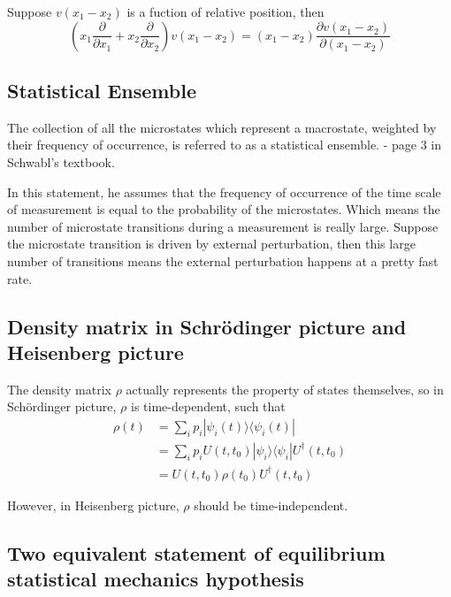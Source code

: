 \documentclass[10pt]{article}
\begin{document}
	Suppose $v(x_1 - x_2)$ is a fuction of relative position, then
	\begin{equation}
		\left(x_1 \frac{\partial}{\partial x_1} + x_2 \frac{\partial}{\partial x_2}\right) v(x_1 - x_2) = (x_1 - x_2) \frac{\partial v(x_1 - x_2)}{\partial (x_1 - x_2)}
	\end{equation}

	\subsection{Statistical Ensemble}

	\begin{remark}
		The collection of all the microstates which represent a macrostate, weighted by their frequency of occurrence, is referred to as a statistical ensemble. - page 3 in Schwabl's textbook.
	\end{remark}

	In this statement, he assumes that the frequency of occurrence of the time scale of measurement is equal to the probability of the microstates. Which means the number of microstate transitions during a measurement is really large. Suppose the microstate transition is driven by external perturbation, then this large number of transitions means the external perturbation happens at a pretty fast rate.

	\subsection{Density matrix in Schr\"{o}dinger picture and Heisenberg picture}

	The density matrix $\rho$ actually represents the property of states themselves, so in Sch\"{o}rdinger picture, $\rho$ is time-dependent, such that
	\begin{align*}
	\rho(t) &= \sum_i p_i |\psi_i(t) \rangle \langle \psi_i (t) | \\
	&= \sum_i p_i U(t,t_0)|\psi_i \rangle \langle \psi_i |U^{\dagger}(t,t_0)\\
	&= U(t,t_0) \rho(t_0) U^{\dagger}(t,t_0)
	\end{align*}

	However, in Heisenberg picture, $\rho$ should be time-independent.

	\subsection{Two equivalent statement of equilibrium statistical mechanics hypothesis}
\end{document}
